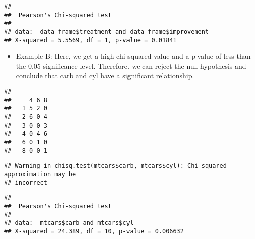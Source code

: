 \documentclass[]{article}
\newenvironment{Shaded}{\begin{snugshade}}{\end{snugshade}}
\newcommand{\DataTypeTok}[1]{\textcolor[rgb]{0.13,0.29,0.53}{#1}}
\newcommand{\KeywordTok}[1]{\textcolor[rgb]{0.13,0.29,0.53}{\textbf{#1}}}
\newcommand{\NormalTok}[1]{#1}
\newcommand{\OperatorTok}[1]{\textcolor[rgb]{0.81,0.36,0.00}{\textbf{#1}}}
\newcommand{\OtherTok}[1]{\textcolor[rgb]{0.56,0.35,0.01}{#1}}
\newcommand{\StringTok}[1]{\textcolor[rgb]{0.31,0.60,0.02}{#1}}
\providecommand{\tightlist}{%
  \setlength{\itemsep}{0pt}\setlength{\parskip}{0pt}}
\begin{document}
\begin{Shaded}
\end{Shaded}

\begin{verbatim}
## 
##  Pearson's Chi-squared test
## 
## data:  data_frame$treatment and data_frame$improvement
## X-squared = 5.5569, df = 1, p-value = 0.01841
\end{verbatim}

\begin{itemize}
\tightlist
\item
  Example B: Here, we get a high chi-squared value and a p-value of less
  than the 0.05 significance level. Therefore, we can reject the null
  hypothesis and conclude that carb and cyl have a significant
  relationship.
\end{itemize}

\begin{Shaded}
\end{Shaded}

\begin{verbatim}
##    
##     4 6 8
##   1 5 2 0
##   2 6 0 4
##   3 0 0 3
##   4 0 4 6
##   6 0 1 0
##   8 0 0 1
\end{verbatim}

\begin{Shaded}
\end{Shaded}

\begin{verbatim}
## Warning in chisq.test(mtcars$carb, mtcars$cyl): Chi-squared approximation may be
## incorrect
\end{verbatim}

\begin{verbatim}
## 
##  Pearson's Chi-squared test
## 
## data:  mtcars$carb and mtcars$cyl
## X-squared = 24.389, df = 10, p-value = 0.006632
\end{verbatim}
\end{document}
